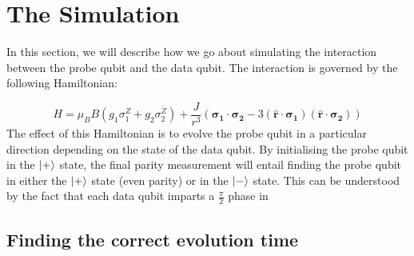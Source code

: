 \section{The Simulation}
In this section, we will describe how we go about simulating the interaction between the probe qubit and the data qubit. The interaction is governed by the following Hamiltonian:

\begin{equation}
H = \mu_B B( g_1 \sigma_1^Z + g_2 \sigma_2^Z) + \frac{J}{r^3} ( \mathbf{\sigma_1} \cdot \mathbf{\sigma_2} - 3 ( \hat{\mathbf{r}} \cdot \mathbf{\sigma_1}) ( \hat{\mathbf{r}}\cdot \mathbf{\sigma_2}))
\end{equation}
The effect of this Hamiltonian is to evolve the probe qubit in a particular direction depending on the state of the data qubit. By initialising the probe qubit in the $\ket{+}$ state, the final parity measurement will entail finding the probe qubit in either the $\ket{+}$ state (even parity) or in the $\ket{-}$ state. This can be understood by the fact that each data qubit imparts a $\frac{\pi}{2}$ phase in 

\subsection{Finding the correct evolution time}

